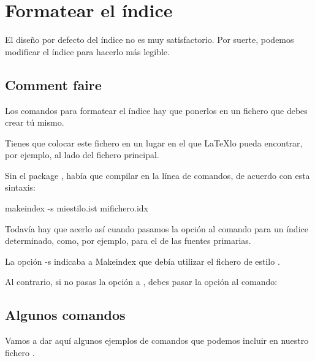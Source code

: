 \chapter{Formatear el índice}\label{styleindex}

\begin{intro}
El diseño por defecto del índice no es muy satisfactorio. Por suerte, podemos modificar el índice para hacerlo más legible.
\end{intro}

\section{Comment faire}
Los comandos para formatear el índice hay que ponerlos en un fichero  que debes crear tú mismo.

\begin{attention}
Tienes que colocar este fichero en un lugar en el que \LaTeX lo pueda encontrar, por ejemplo, al lado del fichero principal.
\end{attention}

Sin el package , había que compilar en la línea de comandos, de acuerdo con esta sintaxis:

\begin{bashcode}
makeindex -s miestilo.ist mifichero.idx
\end{bashcode}

Todavía hay que acerlo así cuando pasamos la opción  al comando  para un índice determinado, como, por ejemplo, para el de las fuentes primarias.

La opción -s indicaba a Makeindex  que debía utilizar el fichero de estilo .

Al contrario, si no pasas la opción  a  , debes pasar la opción   al comando:

\begin{latexcode}
\makeindex[options=-s  miestilo.ist]
\end{latexcode}

\section{Algunos comandos}

Vamos a dar aquí algunos ejemplos de comandos que podemos incluir en nuestro fichero . 

